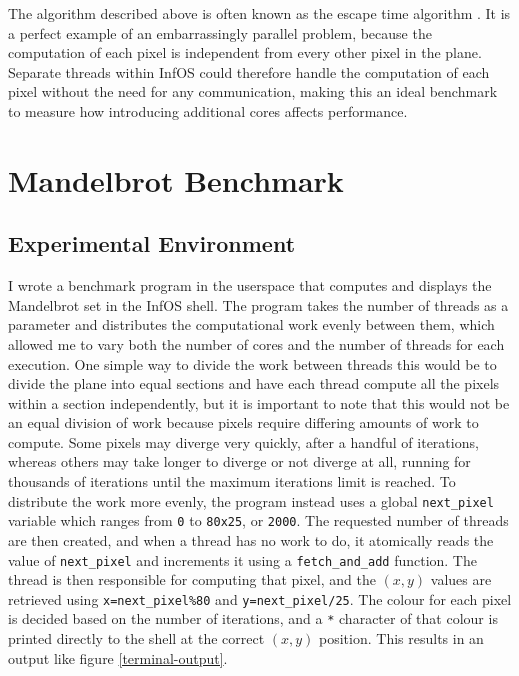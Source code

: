 \documentclass[bsc,frontabs,singlespacing,parskip,deptreport]{infthesis}
\begin{document}
The algorithm described above is often known as the escape time algorithm \cite{mandelbrot-plotting-algorithms}. It is a perfect example of an embarrassingly parallel problem, because the computation of each pixel is independent from every other pixel in the plane. Separate threads within InfOS could therefore handle the computation of each pixel without the need for any communication, making this an ideal benchmark to measure how introducing additional cores affects performance.

\section{Mandelbrot Benchmark} \label{mb-benchmark}
\subsection{Experimental Environment} 
I wrote a benchmark program in the userspace that computes and displays the Mandelbrot set in the InfOS shell. The program takes the number of threads as a parameter and distributes the computational work evenly between them, which allowed me to vary both the number of cores and the number of threads for each execution. One simple way to divide the work between threads this would be to divide the plane into equal sections and have each thread compute all the pixels within a section independently, but it is important to note that this would not be an equal division of work because pixels require differing amounts of work to compute. Some pixels may diverge very quickly, after a handful of iterations, whereas others may take longer to diverge or not diverge at all, running for thousands of iterations until the maximum iterations limit is reached. To distribute the work more evenly, the program instead uses a global \verb|next_pixel| variable which ranges from \verb|0| to \verb|80x25|, or \verb|2000|. The requested number of threads are then created, and when a thread has no work to do, it atomically reads the value of \verb|next_pixel| and increments it using a \verb|fetch_and_add| function. The thread is then responsible for computing that pixel, and the $(x,y)$ values are retrieved using \verb|x=next_pixel%80| and \verb|y=next_pixel/25|. The colour for each pixel is decided based on the number of iterations, and a \verb|*| character of that colour is printed directly to the shell at the correct $(x,y)$ position. This results in an output like figure \ref{terminal-output}.
\end{document}
